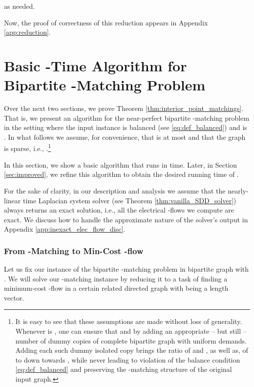 \documentclass[11pt, letterpaper]{article}
\begin{document}
as needed.


Now, the proof of correctness of this reduction appears in Appendix \ref{app:reduction}.  
\section{Basic \texorpdfstring{-Time}{\~O(m\textasciicircum(3/2))-Time} Algorithm for Bipartite -Matching Problem}
\label{sec:simple}



Over the next two sections, we prove Theorem \ref{thm:interior_point_matchings}. That is, we present an algorithm for the {near-perfect} bipartite -matching problem in the setting where the input instance is balanced (see \eqref{eq:def_balanced}) and  is . In what follows we assume, for convenience, that  is at most  and that the graph  is sparse, i.e., .\footnote{It is easy to see that these assumptions are made without loss of generality. Whenever  is , one can ensure that  and  by adding an appropriate -- but still  -- number of dummy copies of complete bipartite  graph with uniform demands. Adding each such dummy isolated copy brings the ratio of  and , as well as, of  to  down towards , while never leading to violation of the balance condition \eqref{eq:def_balanced} and preserving the -matching structure of the original input graph.} 




In this section, we show a basic algorithm that runs in  time. Later, in Section \ref{sec:improved}, we refine this algorithm to obtain the desired running time of .

For the sake of clarity, in our description and analysis we assume that the nearly-linear time Laplacian system solver (see Theorem \ref{thm:vanilla_SDD_solver}) always returns an exact solution, i.e., all the electrical -flows we compute are exact. We discuss how to handle the approximate nature of the solver's output in Appendix \ref{app:inexact_elec_flow_disc}. 

\subsubsection*{From \texorpdfstring{-Matching}{b-Matching} to Min-Cost \texorpdfstring{-flow}{Sigma-flow}}
Let us fix our instance of the bipartite -matching problem in bipartite graph  with . We will solve our -matching instance by reducing it to a task of finding a minimum-cost -flow in a certain related directed graph  with  being a length vector. 
\end{document}
